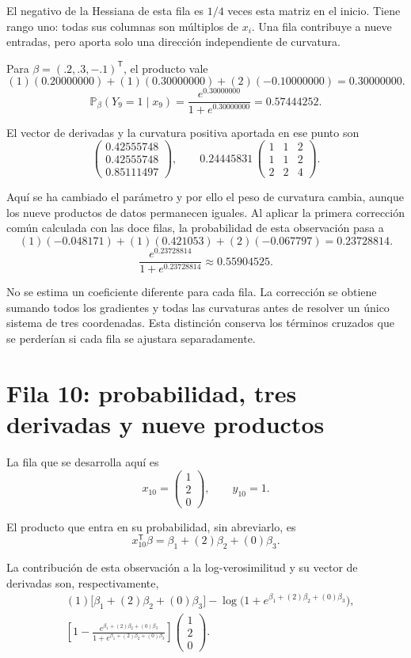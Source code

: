\documentclass[11pt,a4paper]{article}
\newcommand{\Prob}{\mathbb P}
\newcommand{\T}{^{\mathsf T}}
\begin{document}
El negativo de la Hessiana de esta fila es \(1/4\)
veces esta matriz en el inicio. Tiene rango uno:
todas sus columnas son múltiplos de \(x_i\).
Una fila contribuye a nueve entradas, pero aporta
solo una dirección independiente de curvatura.

Para \(\beta=(.2,.3,-.1)\T\), el producto vale
\[
(1)(0.20000000)+(1)(0.30000000)+(2)(-0.10000000)=0.30000000.
\]
\[
\Prob_\beta(Y_{9}=1\mid x_{9})=\frac{e^{0.30000000}}{1+e^{0.30000000}}=0.57444252.
\]

El vector de derivadas y la curvatura positiva aportada
en ese punto son
\[
\begin{pmatrix}0.42555748\\0.42555748\\0.85111497\end{pmatrix},\qquad 0.24445831\,\begin{pmatrix}1&1&2\\1&1&2\\2&2&4\end{pmatrix}.
\]

Aquí se ha cambiado el parámetro y por ello el peso de
curvatura cambia, aunque los nueve productos de datos
permanecen iguales.
Al aplicar la primera corrección común calculada con las doce filas,
la probabilidad de esta observación pasa a
\[
(1)(-0.048171)+(1)(0.421053)+(2)(-0.067797)=0.23728814.
\]
\[
\frac{e^{0.23728814}}{1+e^{0.23728814}}\approx0.55904525.
\]

No se estima un coeficiente diferente para cada fila.
La corrección se obtiene sumando todos los gradientes y todas
las curvaturas antes de resolver un único sistema de tres coordenadas.
Esta distinción conserva los términos cruzados que se perderían
si cada fila se ajustara separadamente.

\clearpage
\section{Fila 10: probabilidad, tres derivadas y nueve productos}\label{logit92}
La fila que se desarrolla aquí es
\[
x_{10}=\begin{pmatrix}1\\2\\0\end{pmatrix},\qquad y_{10}=1.
\]

El producto que entra en su probabilidad, sin abreviarlo, es
\[
x_{10}\T\beta=\beta_1+(2)\beta_2+(0)\beta_3.
\]

La contribución de esta observación a la log-verosimilitud
y su vector de derivadas son, respectivamente,
\[
\begin{aligned}
&(1)\bigl[\beta_1+(2)\beta_2+(0)\beta_3\bigr]-\log\bigl(1+e^{\beta_1+(2)\beta_2+(0)\beta_3}\bigr),\\&\left[1-\frac{e^{\beta_1+(2)\beta_2+(0)\beta_3}}{1+e^{\beta_1+(2)\beta_2+(0)\beta_3}}\right]\begin{pmatrix}1\\2\\0\end{pmatrix}.\end{aligned}
\]
\end{document}
